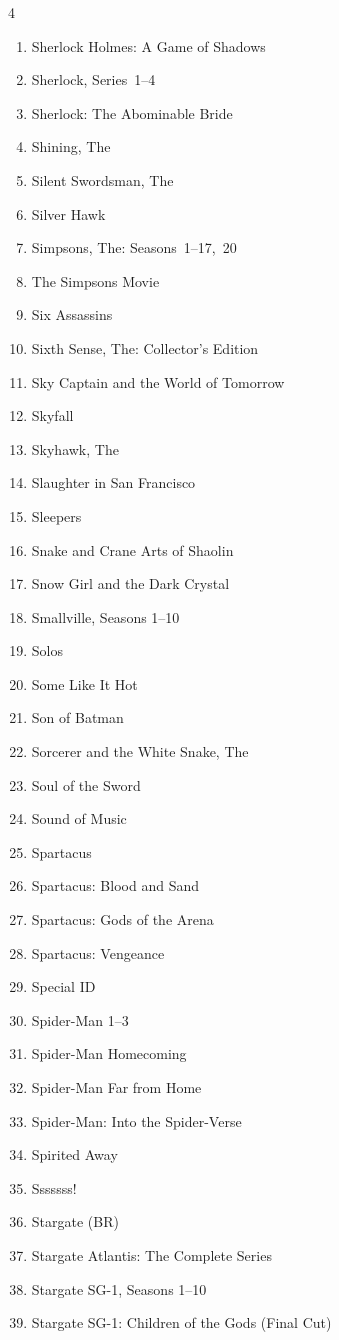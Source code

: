 \documentclass{article}
\begin{document}
\begin{multicols}{4}
\begin{enumerate}
\item Sherlock Holmes: A Game of Shadows
\item Sherlock, Series~1--4
\item Sherlock: The Abominable Bride
\item Shining, The
\item Silent Swordsman, The
\item Silver Hawk
\item Simpsons, The: Seasons~1--17,~20
\item The Simpsons Movie
\item Six Assassins
\item Sixth Sense, The: Collector's Edition
\item Sky Captain and the World of Tomorrow
\item Skyfall
\item Skyhawk, The
\item Slaughter in San Francisco
\item Sleepers
\item Snake and Crane Arts of Shaolin
\item Snow Girl and the Dark Crystal
\item Smallville, Seasons 1--10
\item Solos
\item Some Like It Hot
\item Son of Batman
\item Sorcerer and the White Snake, The
\item Soul of the Sword
\item Sound of Music
\item Spartacus
\item Spartacus: Blood and Sand
\item Spartacus: Gods of the Arena
\item Spartacus: Vengeance
\item Special ID
\item Spider-Man 1--3
\item Spider-Man Homecoming
\item Spider-Man Far from Home
\item Spider-Man: Into the Spider-Verse
\item Spirited Away
\item Sssssss!
\item Stargate (BR)
\item Stargate Atlantis: The Complete Series
\item Stargate SG-1, Seasons 1--10
\item Stargate SG-1: Children of the Gods (Final Cut)

\end{enumerate}
\end{multicols}
\end{document}
